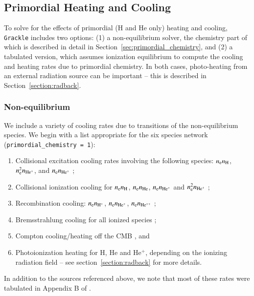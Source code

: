 
\subsection{Primordial Heating and Cooling}

To solve for the effects of primordial (H and He only) heating and cooling, \texttt{Grackle} includes two options: (1) a non-equilibrium solver, the chemistry part of which is described in detail in Section~\ref{sec:primordial_chemistry}, and (2) a tabulated version, which assumes ionization equilibrium to compute the cooling and heating rates due to primordial chemistry.  In both cases, photo-heating from an external radiation source can be important -- this is described in Section~\ref{section:radback}.

\subsubsection{Non-equilibrium} \label{sec:pri-neq}

We include a variety of cooling rates due to transitions of the non-equilibrium species.  We begin with a list appropriate for the six species network (\texttt{primordial\_chemistry = 1}): 

\begin{enumerate}
\item Collisional excitation cooling rates involving the following species: $n_{\rm e} n_{\rm H}$, $n_{\rm e}^2 n_{\rm He^+}$, and $n_{\rm e} n_{\rm He^+}$ \citep{1981MNRAS.197..553B, 1992ApJS...78..341C};
\item Collisional ionization cooling for $n_{\rm e} n_{\rm H}$, $n_{\rm e} n_{\rm He}$, $n_{\rm e} n_{\rm He^+}$ and $n_{\rm e}^2 n_{\rm He^+}$ \citep{1987ApJ...318...32S, 1992ApJS...78..341C, 1997NewA....2..181A};
\item Recombination cooling: $n_{\rm e} n_{\rm H^+}$, $n_{\rm e} n_{\rm He^+}$, $n_{\rm e} n_{\rm He^{++}}$ \citep{1981MNRAS.197..553B, 1992ApJ...387...95F, 1997MNRAS.292...27H};
\item Bremsstrahlung cooling for all ionized species \citep{1981MNRAS.197..553B};
\item Compton cooling/heating off the CMB \citep{1971phco.book.....P}, and 
\item Photoionization heating for H, He and He$^+$, depending on the ionizing radiation field -- see section~\ref{section:radback} for more details.
\end{enumerate}
In addition to the sources referenced above, we note that most of these rates were tabulated in Appendix B of \citet{1997NewA....2..209A}.

